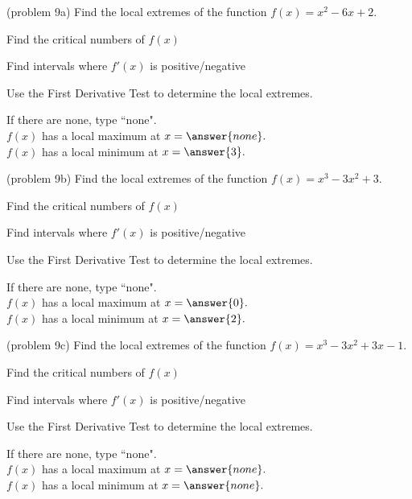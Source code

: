 \documentclass{ximera}
\begin{document}
\begin{problem}(problem 9a)
Find the local extremes of the function $f(x) = x^2 - 6x + 2.$\\
\begin{hint}
Find the critical numbers of $f(x)$
\end{hint}
\begin{hint}
Find intervals where $f'(x)$ is positive/negative
\end{hint}

\begin{hint}
Use the First Derivative Test to determine the local extremes.
\end{hint}

If there are none, type ``none".\\
$f(x)$ has a local maximum at $x = \answer{none}.$\\
$f(x)$ has a local minimum at $x = \answer{3}.$
\end{problem}


\begin{problem}(problem 9b)
Find the local extremes of the function $f(x) = x^3 - 3x^2 + 3.$\\
\begin{hint}
Find the critical numbers of $f(x)$
\end{hint}
\begin{hint}
Find intervals where $f'(x)$ is positive/negative
\end{hint}
\begin{hint}
Use the First Derivative Test to determine the local extremes.
\end{hint}

If there are none, type ``none".\\
$f(x)$ has a local maximum at $x = \answer{0}.$\\
$f(x)$ has a local minimum at $x = \answer{2}.$
\end{problem}


\begin{problem}(problem 9c)
Find the local extremes of the function $f(x) = x^3 - 3x^2 +3x -1.$\\
\begin{hint}
Find the critical numbers of $f(x)$
\end{hint}
\begin{hint}
Find intervals where $f'(x)$ is positive/negative
\end{hint}
\begin{hint}
Use the First Derivative Test to determine the local extremes.
\end{hint}

If there are none, type ``none".\\
$f(x)$ has a local maximum at $x = \answer{none}.$\\
$f(x)$ has a local minimum at $x = \answer{none}.$
\end{problem}
\end{document}
